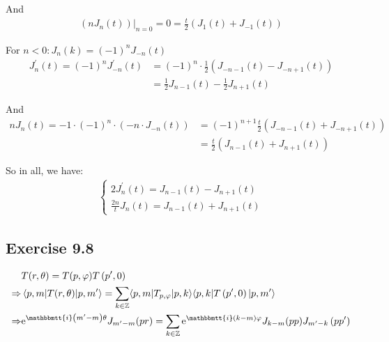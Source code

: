 \documentclass[]{ctexart}
\newcommand{\mi}{\mathbbmtt{i}}
\newcommand{\me}{\mathrm{e}}
\begin{document}
	And 
		\begin{equation*}
		\begin{aligned}
			\left.\left(nJ_n(t)\right)\right|_{n=0}=0=\frac{t}{2}\left(J_1(t)+J_{-1}(t)\right)
		\end{aligned}
		\end{equation*}
		
	For $n<0: J_n(k)=(-1)^nJ_{-n}(t)$
		\begin{equation*}
		\begin{aligned}
			J_{n}^{\prime}(t)=(-1)^{n} J_{-n}^{\prime}(t) &=(-1)^{n} \cdot \frac{1}{2}\left(J_{-n-1}(t)-J_{-n+1}(t)\right) \\
			&=\frac{1}{2} J_{n-1}(t)-\frac{1}{2} J_{n+1}(t)
		\end{aligned}
		\end{equation*}
		
	And 
		\begin{equation*}
		\begin{aligned}
			n J_{n}(t)=-1 \cdot(-1)^{n} \cdot\left(-n \cdot J_{-n}(t)\right)&=(-1)^{n+1} \frac{t}{2}\left(J_{-n-1}(t)+J_{-n+1}(t)\right) \\
			&=\frac{t}{2}\left(J_{n-1}(t)+J_{n+1}(t)\right)
		\end{aligned}
		\end{equation*}
	
	So in all, we have:
		\begin{equation*}
		\begin{aligned}
			\begin{cases}
				2 J_{n}^{\prime}(t)=J_{n-1}(t)-J_{n+1}(t) \\
				\frac{2 n}{t} J_{n}(t)=J_{n-1}(t)+J_{n+1}(t)
			\end{cases}
		\end{aligned}
		\end{equation*}
		
\subsection{Exercise 9.8}
	\begin{equation*}
	\begin{aligned}
		&T(r, \theta)=T(p, \varphi) T\left(p^{\prime}, 0\right) \\
		\Rightarrow&\left\langle p,m|T(r, \theta)| p, m^{\prime}\right\rangle=\sum_{k \in \mathbb{Z}}\langle p, m|T_{ p, \varphi}|p, k\rangle\langle p, k|T\left(p^{\prime}, 0\right)| p, m^{\prime}\rangle \\
		\Rightarrow& \me^{\mi\left(m^{\prime}-m\right) \theta} J_{m^{\prime}-m}(pr)=\sum_{k \in \mathbb{Z}} \me^{\mi(k-m) \varphi} J_{k-m}(p p) J_{m^{\prime}-k}\left(p p^{\prime}\right)
	\end{aligned}
	\end{equation*}
	
\end{document}
